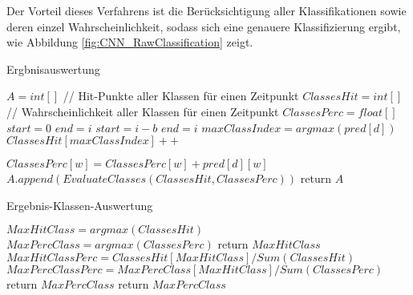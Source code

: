         Der Vorteil dieses Verfahrens ist die Berücksichtigung aller Klassifikationen sowie deren einzel Wahrscheinlichkeit, sodass sich eine genauere Klassifizierung ergibt, wie Abbildung \ref{fig:CNN_RawClassification} zeigt.
        \begin{algorithm}\label{alg:Ergbnisauswertung}
            \caption{Ergbnisauswertung}
            \begin{algorithmic}[1]
                \State {}
                \State
                \State ${A} = int[ ]$
                    \State
                    \State // Hit-Punkte aller Klassen für einen Zeitpunkt
                    \State $ClassesHit = int[ ]$
                    \State // Wahrscheinlichkeit aller Klassen für einen Zeitpunkt
                    \State $ClassesPerc = float[ ]$
                    \State
                        \State $start = 0$
                        \State $end = i$
                    \Else
                        \State $start = i - b$
                        \State $end = i$
                    \EndIf
                    \State
                        \State $maxClassIndex = argmax(pred[d])$
                        \State $ClassesHit[maxClassIndex]++$

                            \State $ClassesPerc[w] = ClassesPerc[w] + pred[d][w]$
                        \EndFor
                    \EndFor
                    \State
                    \State $A.append(EvaluateClasses(ClassesHit, ClassesPerc))$
                    \State
                \EndFor
                \State return $A$
            \EndFunction
            \end{algorithmic}
        \end{algorithm}
        \begin{algorithm}
            \caption{Ergebnis-Klassen-Auswertung}
            \begin{algorithmic}[1]
                \State {}
                \State
                \State $MaxHitClass = argmax(ClassesHit)$
                \State $MaxPercClass = argmax(ClassesPerc)$
                \State
                    \State return $MaxHitClass$
                \Else
                    \State
                    \State $MaxHitClassPerc = ClassesHit[MaxHitClass] / Sum(ClassesHit) $
                    \State $MaxPercClassPerc = MaxPercClass[MaxHitClass] / Sum(ClassesPerc) $
                    \State
                        \State return $MaxPercClass$
                    \Else
                        \State return $MaxPercClass$
                    \EndIf
                \EndIf
            \EndFunction
            \end{algorithmic}
        \end{algorithm}